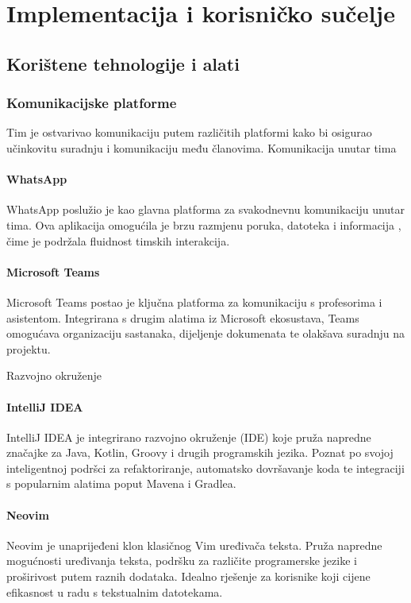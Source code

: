 \chapter{Implementacija i korisničko sučelje}
		
		
		\section{Korištene tehnologije i alati}
		
\subsection{Komunikacijske platforme}

Tim je ostvarivao komunikaciju putem različitih platformi kako bi osigurao učinkovitu suradnju i komunikaciju među članovima.
Komunikacija unutar tima

\subsubsection{WhatsApp}
WhatsApp poslužio je kao glavna platforma za svakodnevnu komunikaciju unutar 
tima. Ova aplikacija omogućila je brzu razmjenu poruka, datoteka i informacija
, čime je podržala fluidnost timskih interakcija.

\subsubsection{Microsoft Teams}
Microsoft Teams postao je ključna platforma za komunikaciju s profesorima i 
asistentom. Integrirana s drugim alatima iz Microsoft ekosustava, Teams 
omogućava organizaciju sastanaka, dijeljenje dokumenata te olakšava suradnju 
na projektu.

Razvojno okruženje

\subsubsection{IntelliJ IDEA}
IntelliJ IDEA je integrirano razvojno okruženje (IDE) koje pruža napredne 
značajke za Java, Kotlin, Groovy i drugih programskih jezika. Poznat po svojoj 
inteligentnoj podršci za refaktoriranje, automatsko dovršavanje koda te 
integraciji s popularnim alatima poput Mavena i Gradlea.

\subsubsection{Neovim}
Neovim je unaprijeđeni klon klasičnog Vim uređivača teksta. Pruža napredne 
mogućnosti uređivanja teksta, podršku za različite programerske jezike i 
proširivost putem raznih dodataka. Idealno rješenje za korisnike koji cijene 
efikasnost u radu s tekstualnim datotekama.

